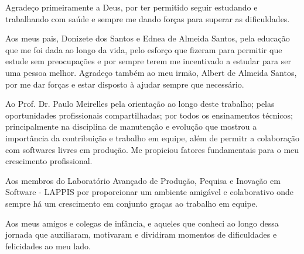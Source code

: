 \begin{agradecimentos}

Agradeço primeiramente a Deus, por ter permitido seguir estudando e trabalhando com saúde
e sempre me dando forças para superar as dificuldades.

Aos meus pais, Donizete dos Santos e Ednea de Almeida Santos, pela educação que me foi dada ao longo da vida, pelo esforço que fizeram para permitir que estude sem preocupações e por sempre terem me incentivado a estudar para ser uma pessoa melhor. Agradeço também ao meu irmão, Albert de Almeida Santos, por me dar forças e estar disposto à ajudar sempre que necessário.

Ao Prof. Dr. Paulo Meirelles pela orientação ao longo deste trabalho; pelas oportunidades profissionais compartilhadas; por todos os ensinamentos técnicos; principalmente na disciplina de manutenção e evolução que mostrou a importância da contribuição e trabalho em equipe, além de permitr a colaboração com softwares livres em produção. Me propiciou fatores fundamentais para o meu crescimento profissional.

Aos membros do Laboratório Avançado de Produção, Pequisa e
Inovação em Software - LAPPIS por proporcionar um ambiente amigável e colaborativo onde sempre há um crescimento em conjunto graças ao trabalho em equipe. 

Aos meus amigos e colegas de infância, e aqueles que conheci ao longo dessa jornada que auxiliaram, motivaram e dividiram momentos de dificuldades e felicidades ao meu lado.

\end{agradecimentos}